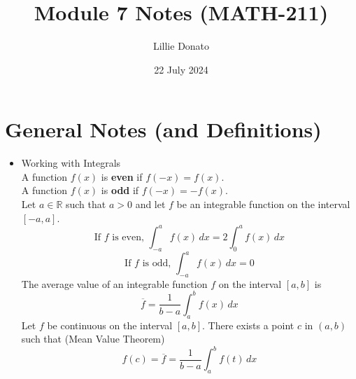 \documentclass{article}
\title{Module 7 Notes (MATH-211)}
\author{Lillie Donato}
\date{22 July 2024}
\begin{document}
\maketitle

\section*{General Notes (and Definitions)}
\begin{itemize}
    \item Working with Integrals \\
        A function $f(x)$ is \textbf{even} if $f(-x) = f(x)$. \\
        A function $f(x)$ is \textbf{odd} if $f(-x) = -f(x)$. \\
        Let $a \in \mathbb{R}$ such that $a > 0$ and let $f$ be an integrable function on the interval $[-a,a]$.
        $$\text{If } f \text{ is even, } \int_{-a}^a{f(x)\,dx} = 2\int_0^a{f(x)\,dx}$$
        $$\text{If } f \text{ is odd, } \int_{-a}^a{f(x)\,dx} = 0$$
        The average value of an integrable function $f$ on the interval $[a,b]$ is
        $$\overline{f} = \frac{1}{b - a}\int_a^b{f(x)\,dx}$$
        Let $f$ be continuous on the interval $[a,b]$. There exists a point $c$ in $(a,b)$ such that (Mean Value Theorem)
        $$f(c) = \overline{f} = \frac{1}{b - a}\int_a^b{f(t)\,dx}$$
\end{itemize}
\end{document}

